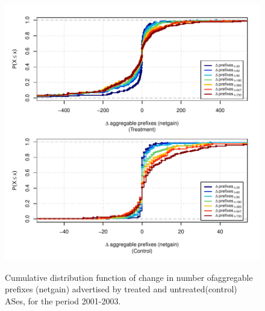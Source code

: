 \clearpage
\vspace*{1.25em}
\begin{figure}[H]
\begin{centering}
\begin{singlespace}
\captionsetup{list=no}
    \includegraphics[width=6in]{figures/behavior-netgain-2001_2003-corr.pdf}
    \vspace{-2em}\\
    \caption{Cumulative distribution function of change in number ofaggregable
    prefixes (netgain) advertised by treated and untreated(control) ASes, for
    the period 2001-2003.}
\end{singlespace}
\end{centering}
\end{figure}

